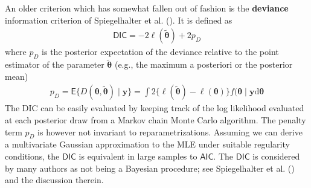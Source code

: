 \documentclass[
  11pt,
  letterpaper,
]{scrbook}
\theoremstyle{definition}
\theoremstyle{plain}
\theoremstyle{plain}
\theoremstyle{definition}
\theoremstyle{definition}
\theoremstyle{remark}
\begin{document}
An older criterion which has somewhat fallen out of fashion is the
\textbf{deviance} information criterion of Spiegelhalter et al.
(). It is defined as
\begin{align*}
\mathsf{DIC} = -2 \ell(\widetilde{\boldsymbol{\theta}}) + 2 p_D
\end{align*} where \(p_D\) is the posterior expectation of the deviance
relative to the point estimator of the parameter
\(\widetilde{\boldsymbol{\theta}}\) (e.g., the maximum a posteriori or
the posterior mean) \begin{align*}
p_D = \mathsf{E}\{D(\boldsymbol{\theta}, \widetilde{\boldsymbol{\theta}}) \mid \boldsymbol{y}\}= \int 2 \{ \ell(\widetilde{\boldsymbol{\theta}}) - \ell(\boldsymbol{\theta})\} f(\boldsymbol{\theta} \mid \boldsymbol{y} \mathrm{d} \boldsymbol{\theta}
\end{align*} The DIC can be easily evaluated by keeping track of the log
likelihood evaluated at each posterior draw from a Markov chain Monte
Carlo algorithm. The penalty term \(p_D\) is however not invariant to
reparametrizations. Assuming we can derive a multivariate Gaussian
approximation to the MLE under suitable regularity conditions, the
\(\mathsf{DIC}\) is equivalent in large samples to \(\mathsf{AIC}.\) The
\(\mathsf{DIC}\) is considered by many authors as not being a Bayesian
procedure; see Spiegelhalter et al.
() and the discussion therein.
\end{document}
